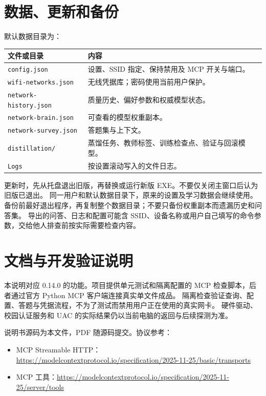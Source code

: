 \documentclass[UTF8,fontset=fandol,11pt,a4paper]{ctexart}
\newcommand{\tool}[1]{\nolinkurl{#1}}
\begin{document}
\section{数据、更新和备份}
默认数据目录为：
\begin{Code}
\end{Code}
\begin{tabularx}{\linewidth}{@{}p{58mm}X@{}}
\toprule
文件或目录 & 内容\\\midrule
\tool{config.json} & 设置、SSID 指定、保持禁用及 MCP 开关与端口。\\
\tool{wifi-networks.json} & 无线凭据库；密码使用当前用户保护。\\
\tool{network-history.json} & 质量历史、偏好参数和权威模型状态。\\
\tool{network-brain.json} & 可查看的模型权重副本。\\
\tool{network-survey.json} & 答题集与上下文。\\
\tool{distillation/} & 蒸馏任务、教师标签、训练检查点、验证与回滚模型。\\
\tool{Logs} & 按设置滚动写入的文件日志。\\
\bottomrule
\end{tabularx}

更新时，先从托盘退出旧版，再替换或运行新版 EXE。不要仅关闭主窗口后认为旧版已退出。
同一用户和默认数据目录下，原来的设置及学习数据会继续使用。
备份前最好退出程序，再复制整个数据目录；不要只备份权重副本而遗漏历史和问答集。
导出的问答、日志和配置可能含 SSID、设备名称或用户自己填写的命令参数，交给他人排查前按实际需要检查内容。

\section{文档与开发验证说明}
本说明对应 0.14.0 的功能。项目提供单元测试和隔离配置的 MCP 检查脚本，后者通过官方 Python MCP 客户端连接真实单文件成品。
隔离检查验证查询、配置、答题与凭据流程，不为了测试而禁用用户正在使用的真实网卡。
硬件驱动、校园认证服务和 UAC 的实际结果仍以当前电脑的返回与后续探测为准。

说明书源码为本文件，PDF 随源码提交。协议参考：
\begin{itemize}
\item MCP Streamable HTTP：\url{https://modelcontextprotocol.io/specification/2025-11-25/basic/transports}
\item MCP 工具：\url{https://modelcontextprotocol.io/specification/2025-11-25/server/tools}
\end{itemize}
\clearpage
\appendix
\end{document}
